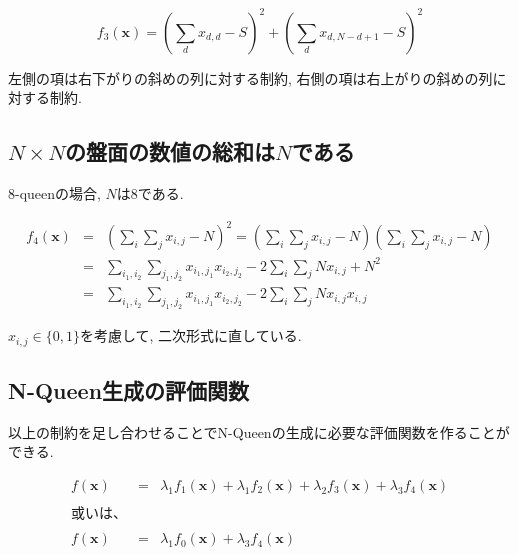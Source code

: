 \documentclass[uplatex,dvipdfmx,a4paper,11pt,oneside,openany]{jsbook}
\begin{document}
\[
f_3(\bm{x}) = \left(\sum_d x_{d,d} - S \right)^2 + \left(\sum_d x_{d,N-d+1} - S \right)^2
\]

左側の項は右下がりの斜めの列に対する制約, 右側の項は右上がりの斜めの列に対する制約.

\subsection{$N\times N$の盤面の数値の総和は$N$である}

8-queenの場合, $N$は$8$である.

\begin{eqnarray*}
f_4(\bm{x})&=&\left(\sum_i\sum_j x_{i,j} - N\right)^2=\left(\sum_i\sum_j x_{i,j} - N\right)\left(\sum_i\sum_j x_{i,j} - N\right)\\
&=&\sum_{i_1,i_2}\sum_{j_1,j_2}x_{i_1,j_1}x_{i_2,j_2}-2\sum_i\sum_j N x_{i,j} + N^2\\
&=&\sum_{i_1,i_2}\sum_{j_1,j_2}x_{i_1,j_1}x_{i_2,j_2} -2\sum_i\sum_j N x_{i,j}x_{i,j}
\end{eqnarray*}

$x_{i,j}\in \{0,1\}$を考慮して, 二次形式に直している.





\subsection{N-Queen生成の評価関数}

以上の制約を足し合わせることでN-Queenの生成に必要な評価関数を作ることができる.

\begin{eqnarray*}
  f(\bm{x}) &=& \lambda_1 f_1(\bm{x}) + \lambda_1 f_2(\bm{x}) + \lambda_2 f_3(\bm{x}) + \lambda_3 f_4(\bm{x})\\
  \\或いは、\\\\
  f(\bm{x}) &=& \lambda_1 f_0(\bm{x}) + \lambda_3 f_4(\bm{x})
\end{eqnarray*}
\end{document}
